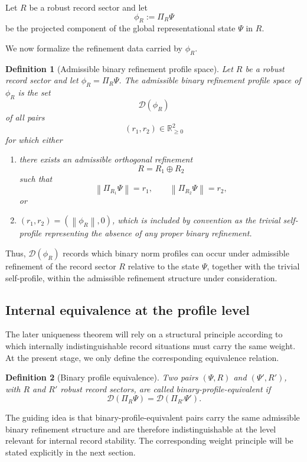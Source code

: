 \documentclass[11pt]{article}
\newtheorem{definition}{Definition}
\theoremstyle{remark}
\numberwithin{equation}{section}
\newcommand{\RR}{\mathbb{R}}
\newcommand{\Proj}[1]{\Pi_{#1}}
\newcommand{\norm}[1]{\left\lVert #1 \right\rVert}
\begin{document}
Let $R$ be a robust record sector and let
\[
\phi_R := \Proj{R}\Psi
\]
be the projected component of the global representational state $\Psi$ in $R$.

We now formalize the refinement data carried by $\phi_R$.

\begin{definition}[Admissible binary refinement profile space]
Let $R$ be a robust record sector and let $\phi_R = \Proj{R}\Psi$. The \emph{admissible binary refinement profile space} of $\phi_R$ is the set
\[
\mathcal{D}(\phi_R)
\]
of all pairs
\[
(r_1,r_2) \in \RR_{\geq 0}^2
\]
for which either
\begin{enumerate}[label=(\roman*)]
\item there exists an admissible orthogonal refinement
\[
R = R_1 \oplus R_2
\]
such that
\[
\norm{\Proj{R_1}\Psi} = r_1,
\qquad
\norm{\Proj{R_2}\Psi} = r_2,
\]
or
\item $(r_1,r_2) = (\norm{\phi_R},0)$, which is included by convention as the trivial self-profile representing the absence of any proper binary refinement.
\end{enumerate}
\end{definition}

Thus, $\mathcal{D}(\phi_R)$ records which binary norm profiles can occur under admissible refinement of the record sector $R$ relative to the state $\Psi$, together with the trivial self-profile, within the admissible refinement structure under consideration.

\subsection{Internal equivalence at the profile level}

The later uniqueness theorem will rely on a structural principle according to which internally indistinguishable record situations must carry the same weight. At the present stage, we only define the corresponding equivalence relation.

\begin{definition}[Binary profile equivalence]
Two pairs $(\Psi,R)$ and $(\Psi',R')$, with $R$ and $R'$ robust record sectors, are called \emph{binary-profile-equivalent} if
\[
\mathcal{D}(\Proj{R}\Psi) = \mathcal{D}(\Proj{R'}\Psi').
\]
\end{definition}

The guiding idea is that binary-profile-equivalent pairs carry the same admissible binary refinement structure and are therefore indistinguishable at the level relevant for internal record stability. The corresponding weight principle will be stated explicitly in the next section.
\end{document}
